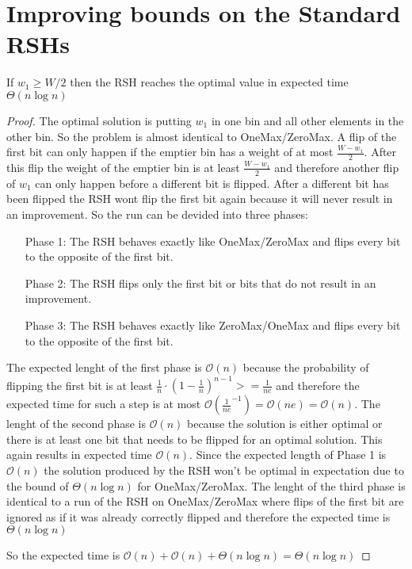 \section{Improving bounds on the Standard RSHs}
\begin{lemma}
If $w_1 \ge W/2$  then the RSH reaches the optimal value in expected time $\Theta(n\log{}n)$
\end{lemma}
\begin{proof}
The optimal solution is putting $w_1$ in one bin and all other elements in the other bin. So the problem is almost identical to OneMax/ZeroMax. A flip of the first bit can only happen if the emptier bin has a weight of at most $\frac {W-w_1}{2}$. After this flip the weight of the emptier bin is at least $\frac {W-w_1}{2}$ and therefore another flip of $w_1$ can only happen before a different bit is flipped. After a different bit has been flipped the RSH wont flip the first bit again because it will never result in an improvement. So the run can be devided into three phases:
\begin{itemize}
    \item[Phase 1:] The RSH behaves exactly like OneMax/ZeroMax and flips every bit to the opposite of the first bit.
    \item[Phase 2:] The RSH flips only the first bit or bits that do not result in an improvement.
    \item[Phase 3:] The RSH behaves exactly like ZeroMax/OneMax and flips every bit to the opposite of the first bit.
\end{itemize}

The expected lenght of the first phase is $\mathcal{O}(n)$ because the probability of flipping the first bit is at least ${\frac{1}{n}} \cdot (1 - \frac{1}{n})^{n-1} >= \frac{1}{ne}$ and therefore the expected time for such a step is at most $\mathcal{O}(\frac{1}{ne}^{-1}) = \mathcal{O}(ne) = \mathcal{O}(n)$.\newline
The lenght of the second phase is $\mathcal{O}(n)$ because the solution is either optimal or there is at least one bit that needs to be flipped for an optimal solution. This again results in expected time $\mathcal{O}(n)$. Since the expected length of Phase 1 is $\mathcal{O}(n)$ the solution produced by the RSH won't be optimal in expectation due to the bound of $\Theta(n\log{}n)$ for OneMax/ZeroMax. \newline
The lenght of the third phase is identical to a run of the RSH on OneMax/ZeroMax where flips of the first bit are ignored as if it was already correctly flipped and therefore the expected time is $\Theta(n\log{}n)$

So the expected time is $\mathcal{O}(n) + \mathcal{O}(n) + \Theta(n\log{}n) = \Theta(n\log{}n)$ 
\end{proof}

